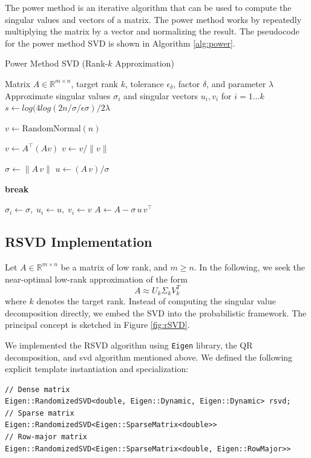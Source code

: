 \documentclass[11pt,a4paper]{article}
\begin{document}
The power method is an iterative algorithm that can be used to compute the singular values and vectors of a matrix. The power method works by repeatedly multiplying the matrix by a vector and normalizing the result. The pseudocode for the power method SVD is shown in Algorithm \ref{alg:power}.

\begin{algorithm}[H]
\caption{Power Method SVD (Rank-$k$ Approximation)}
\begin{algorithmic}[1]
\label{alg:power}
\REQUIRE Matrix $A \in \mathbb{R}^{m \times n}$, target rank $k$, tolerance $\epsilon_\delta$, factor $\delta$, and parameter $\lambda$
\ENSURE Approximate singular values $\sigma_i$ and singular vectors $u_i, v_i$ for $i = 1 \dots k$
  \STATE $s \gets log(4log(2n / \sigma / \epsilon \sigma) / 2 \lambda$


  \STATE $v \gets \text{RandomNormal}(n)$ 

    \STATE $v \gets A^\top (A v)$
    \STATE $v \gets v / \|v\|$
  \ENDFOR

  \STATE $\sigma \gets \|A\,v\|$
  \STATE $u \gets (A\,v)/\sigma$

    \STATE \textbf{break}
  \ENDIF

  \STATE $\sigma_i \gets \sigma,\; u_i \gets u,\; v_i \gets v$
  \STATE $A \gets A - \sigma \,u\, v^\top$
\ENDFOR

\end{algorithmic}
\end{algorithm}


\subsection{RSVD Implementation}
Let $A \in \mathbb{R}^{m \times n}$ be a matrix of low rank, and $m \ge n$. 
In the following, we seek the near-optimal low-rank approximation of the form
\[
A \approx U_k \Sigma_k V_k^T
\]
where $k$ denotes the target rank. Instead of computing the singular value decomposition directly, we embed the SVD into the probabilistic framework. The principal concept is sketched in Figure \ref{fig:rSVD}.

We implemented the RSVD algorithm using \texttt{Eigen} library, the QR decomposition, and svd algorithm mentioned above. We defined the following explicit template instantiation and specialization:
\begin{verbatim}
// Dense matrix
Eigen::RandomizedSVD<double, Eigen::Dynamic, Eigen::Dynamic> rsvd;
// Sparse matrix
Eigen::RandomizedSVD<Eigen::SparseMatrix<double>>
// Row-major matrix
Eigen::RandomizedSVD<Eigen::SparseMatrix<double, Eigen::RowMajor>>
\end{verbatim}
\end{document}
